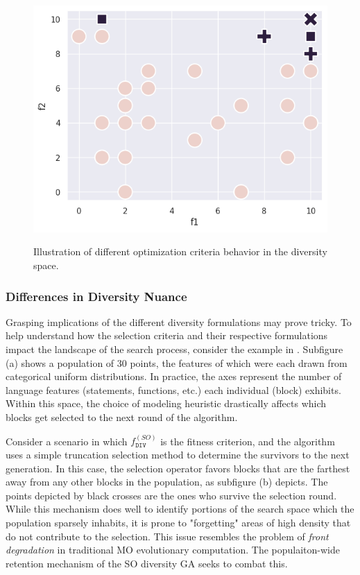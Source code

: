 \begin{figure}[t!]
{\includegraphics[scale=0.27]{img/diversity_mo_selection.png}
}

\caption{Illustration of different optimization criteria behavior in the diversity space.}
\label{fig:diversity}
\end{figure}

\subsubsection{\label{subsec:diversity-example}Differences in Diversity Nuance}

Grasping implications of the different diversity formulations
may prove tricky.
To help understand how the selection criteria and their respective formulations
impact the landscape of the search process, consider the example in .
Subfigure (a) shows a population of 30 points, the features of which
were each drawn from categorical uniform distributions.
In practice, the axes represent the number of language
features (statements, functions, etc.)
each individual (block) exhibits.
Within this space, the choice of modeling heuristic drastically affects
which blocks get selected to the next round of the algorithm.

Consider a scenario in which $f^{(SO)}_{\texttt{DIV}}$ is the fitness criterion,
and the algorithm uses a simple truncation selection method
to determine the survivors to the next generation.
In this case, the selection operator favors
blocks that are the farthest away
from any other blocks in the population, as subfigure (b) depicts.
The points depicted by black crosses are the ones
who survive the selection round.
While this mechanism does well to identify 
portions of the search space which the population
sparsely inhabits, it is prone to "forgetting"
areas of high density that do not contribute to the selection.
This issue resembles the problem of \textit{front degradation}
in traditional \Gls{MO} evolutionary computation.
The populaiton-wide retention mechanism of the \gls{SO} diversity
\gls{GA} seeks to combat this.

